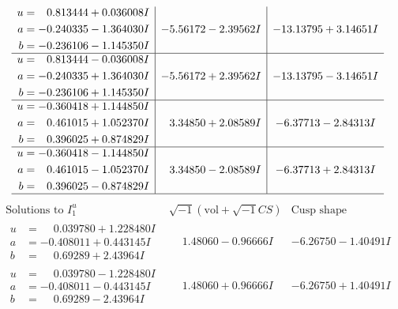 \documentclass[1p]{elsarticle_modified}
\theoremstyle{definition}
\newcommand{\I}{\sqrt{-1}}
\begin{document}
$$\begin{array}{c|c|c}
\begin{aligned}
u &= \phantom{-}0.813444 + 0.036008 I \\
a &= -0.240335 - 1.364030 I \\
b &= -0.236106 - 1.145350 I\end{aligned}
 & -5.56172 - 2.39562 I & -13.13795 + 3.14651 I \\ \hline\begin{aligned}
u &= \phantom{-}0.813444 - 0.036008 I \\
a &= -0.240335 + 1.364030 I \\
b &= -0.236106 + 1.145350 I\end{aligned}
 & -5.56172 + 2.39562 I & -13.13795 - 3.14651 I \\ \hline\begin{aligned}
u &= -0.360418 + 1.144850 I \\
a &= \phantom{-}0.461015 + 1.052370 I \\
b &= \phantom{-}0.396025 + 0.874829 I\end{aligned}
 & \phantom{-}3.34850 + 2.08589 I & -6.37713 - 2.84313 I \\ \hline\begin{aligned}
u &= -0.360418 - 1.144850 I \\
a &= \phantom{-}0.461015 - 1.052370 I \\
b &= \phantom{-}0.396025 - 0.874829 I\end{aligned}
 & \phantom{-}3.34850 - 2.08589 I & -6.37713 + 2.84313 I\\
 \hline 
 \end{array}$$\newpage$$\begin{array}{c|c|c}  
\text{Solutions to }I^u_{1}& \I (\text{vol} + \sqrt{-1}CS) & \text{Cusp shape}\\
 \hline 
\begin{aligned}
u &= \phantom{-}0.039780 + 1.228480 I \\
a &= -0.408011 + 0.443145 I \\
b &= \phantom{-}0.69289 + 2.43964 I\end{aligned}
 & \phantom{-}1.48060 - 0.96666 I & -6.26750 - 1.40491 I \\ \hline\begin{aligned}
u &= \phantom{-}0.039780 - 1.228480 I \\
a &= -0.408011 - 0.443145 I \\
b &= \phantom{-}0.69289 - 2.43964 I\end{aligned}
 & \phantom{-}1.48060 + 0.96666 I & -6.26750 + 1.40491 I \\ \hline\begin{aligned}

\end{aligned}
\end{array}$$
\end{document}
